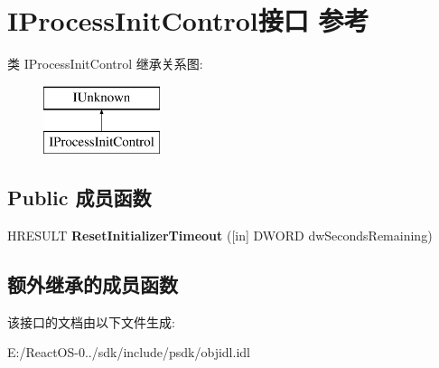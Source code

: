 \hypertarget{interface_i_process_init_control}{}\section{I\+Process\+Init\+Control接口 参考}
\label{interface_i_process_init_control}
类 I\+Process\+Init\+Control 继承关系图\+:\begin{figure}[H]
\begin{center}
\leavevmode
\includegraphics[height=2.000000cm]{interface_i_process_init_control}
\end{center}
\end{figure}
\subsection*{Public 成员函数}
\begin{DoxyCompactItemize}
\item 
\mbox{\label{interface_i_process_init_control_aff63728b8a9ee363acfc4d8e7a680d59}} 
H\+R\+E\+S\+U\+LT {\bfseries Reset\+Initializer\+Timeout} (\mbox{[}in\mbox{]} D\+W\+O\+RD dw\+Seconds\+Remaining)
\end{DoxyCompactItemize}
\subsection*{额外继承的成员函数}


该接口的文档由以下文件生成\+:\begin{DoxyCompactItemize}
\item 
E\+:/\+React\+O\+S-\/0../sdk/include/psdk/objidl.\+idl\end{DoxyCompactItemize}
